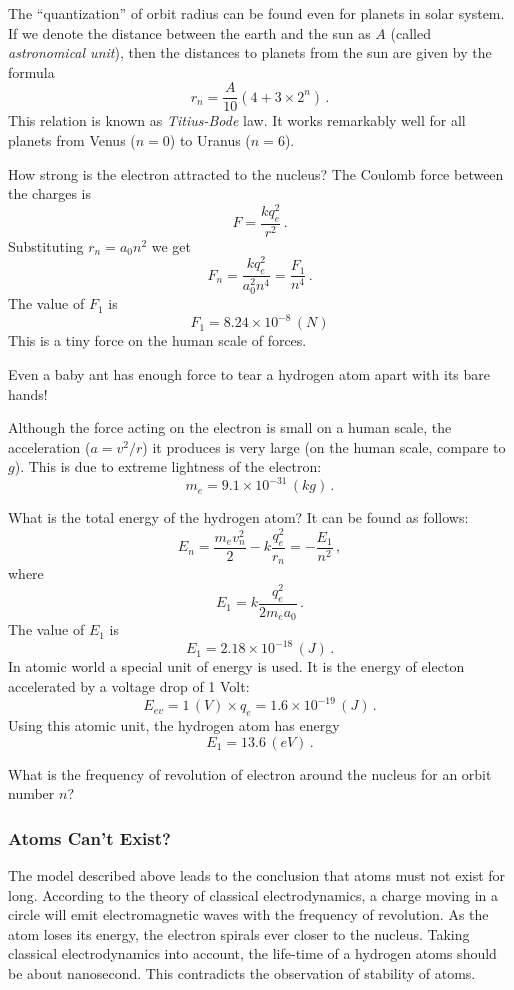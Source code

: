 \begin{tcolorbox}[colback=white!85!ocre, title=$\circledast\,$Fun Fact]
	The ``quantization'' of orbit radius can be found even for planets in
	solar system. If we denote the distance between the earth and the sun
	as $A$ (called \emph{astronomical unit}), then the distances to
	planets from the sun are given by the formula
	\[
	r_n = \frac{A}{10}(4+3\times 2^n)\,.
	\]
	This relation is known as \emph{Titius-Bode} law. It works remarkably
	well for all planets from Venus ($n=0$) to Uranus ($n=6$).
\end{tcolorbox}

How strong is the electron attracted to the nucleus? The Coulomb force
between the charges is
\[
F = \frac{kq_e^2}{r^2}\,.
\]
Substituting $r_n = a_0 n^2$ we get
\[
F_n = \frac{kq_e^2}{a_0^2 n^4} = \frac{F_1}{n^4}\,.
\]
The value of $F_1$ is
\[
F_1 = 8.24\times 10^{-8}\,(N)
\]
This is a tiny force on the human scale of forces.
\begin{tcolorbox}[colback=white!85!ocre, title=$\circledast\,$Fun Fact]
	Even a baby ant has enough force to tear a hydrogen atom apart with
	its bare hands!
\end{tcolorbox}
Although the force acting on the electron is small on a human scale,
the acceleration ($a=v^2/r$) it produces is very large (on the human
scale, compare to $g$). This is due to extreme lightness of the
electron:
\[
m_e = 9.1\times 10^{-31}\, (kg)\,.
\]

What is the total energy of the hydrogen atom? It can be found as
follows:
\[
E_n = \frac{m_ev_n^2}{2}-k\frac{q_e^2}{r_n} = -\frac{E_1}{n^2}\,,
\]
where
\[
E_1 = k\frac{q_e^2}{2m_e a_0}\,.
\]
The value of $E_1$ is
\[
E_1 = 2.18\times 10^{-18}\, (J)\,.
\]
In atomic world a special unit of energy is used. It is the energy of
electon accelerated by a voltage drop of 1 Volt:
\[
E_{ev} = 1\,(V)\times q_e = 1.6\times 10^{-19}\, (J)\,.
\]
Using this atomic unit, the hydrogen atom has energy
\[
E_1 = 13.6\, (eV)\,.
\]

\begin{exercise}
	What is the frequency of revolution of electron around the nucleus
	for an orbit number $n$?
\end{exercise}

\subsubsection{Atoms Can't Exist?}
The model described above leads to the conclusion that atoms must not
exist for long. According to the theory of classical electrodynamics,
a charge moving in a circle will emit electromagnetic
waves with the frequency of revolution. As the atom loses its energy,
the electron spirals ever closer to the nucleus. Taking classical
electrodynamics into account, the life-time of a hydrogen atoms should
be about nanosecond. This contradicts the observation of stability of
atoms.

